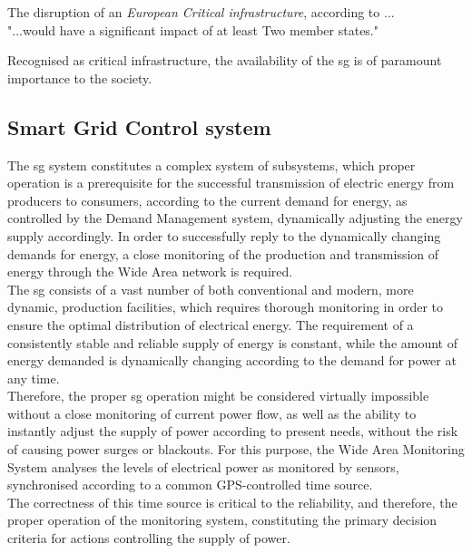  The disruption of an \textit{European Critical infrastructure}, according to  \cite{eu2008council}... \\ "...would have a significant impact of at least Two member states."

Recognised as critical infrastructure, the availability of the \acrlong{sg} is of paramount importance to the society. 








\subsection{Smart Grid  Control system}
The \acrlong{sg} system constitutes a complex system of subsystems, which proper operation is a prerequisite for the successful transmission of electric energy from producers to consumers, according to the current demand for energy, as controlled by the Demand Management system, dynamically adjusting the energy supply accordingly. In order to successfully reply to the dynamically changing demands for energy, a close monitoring of the production and transmission of energy through the Wide Area network is required. \\ 

The \acrshort{sg} consists of a vast number of both conventional and modern, more dynamic, production facilities, which requires thorough monitoring in order to ensure the optimal distribution of electrical energy. The requirement of a consistently stable and reliable supply of energy is constant, while the amount of energy demanded is dynamically changing according to the demand for power at any time. \\ 

Therefore, the proper \acrshort{sg} operation might be considered virtually impossible without a  close monitoring of current power flow, as well as the ability to instantly adjust the supply of power according to present needs,  without the risk of causing power surges or blackouts. For this purpose, the Wide Area Monitoring System analyses the levels of electrical power as monitored by sensors, synchronised according to a common GPS-controlled time source. \\ 

The correctness of this time source is critical to the reliability, and therefore, the proper operation of the monitoring system, constituting the primary decision criteria for actions controlling the supply of power.



